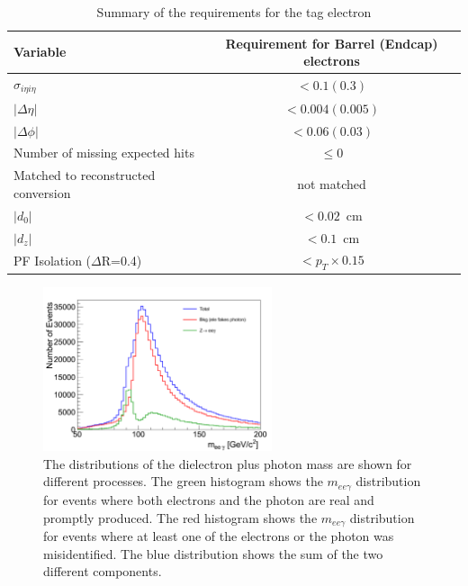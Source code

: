 \documentclass{cmspaper}
\begin{document}
\begin{table}[!ht]
  \centering
  \begin{tabular}{|l|c|}
    \hline
    Variable                            &  Requirement for Barrel (Endcap) electrons   \\
    \hline
    $\sigma_{i\eta i\eta}$              & $ < 0.1 (0.3) $                              \\
    $|\Delta\eta|$                      & $ < 0.004 (0.005)$                           \\
    $|\Delta\phi|$                      & $ < 0.06 (0.03)$                             \\
    Number of missing expected hits     & $ \le 0$                                     \\
    Matched to reconstructed conversion & not matched                                  \\
    $|d_{0}|$                           & $ < 0.02$~cm                                 \\
    $|d_{z}|$                           & $ < 0.1$~cm                                  \\
    PF Isolation ($\Delta$R=0.4)        & $ < p_{T} \times 0.15$                       \\
    \hline
  \end{tabular}
  \caption{ Summary of the requirements for the tag electron}
  \label{tab:TagElectronCuts}
\end{table}




\begin{figure}[htb]
  \begin{center}
    \includegraphics[width=0.6\textwidth]{figures/MassEEGamma_NoSelection.pdf}
    \caption{The distributions of the dielectron plus photon mass are shown for different processes. 
      The green histogram shows the $m_{ee\gamma}$ distribution for events where both electrons
      and the photon are real and promptly produced. The red histogram shows the $m_{ee\gamma}$ 
      distribution for events where at least one of the electrons or the photon was misidentified.
      The blue distribution shows the sum of the two different components.
    }
    \label{fig:MassEEGamma_NoSelection}
  \end{center}
\end{figure}
\end{document}
